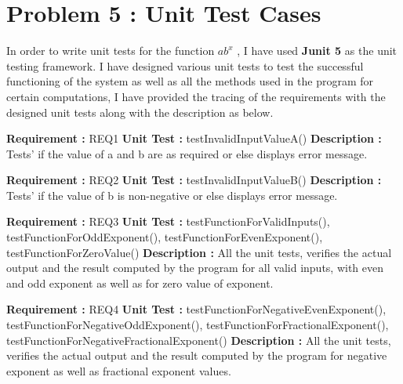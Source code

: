 \documentclass[12pt, a4paper]{article}
\begin{document}
\newpage

\section{Problem 5 : Unit Test Cases }
In order to write unit tests for the function $ab^x$ , I have used \textbf{Junit 5} \cite{JUnit5} as the unit testing framework. I have designed various unit tests to test the successful functioning of the system as well as all the methods used in the program for certain computations, I have provided the tracing of the requirements with the designed unit tests along with the description as below.  
\newline
    
\noindent
\textbf{Requirement : }  REQ1 
    \newline
    \textbf{Unit Test : } testInvalidInputValueA()
    \newline
    \textbf{Description :} Tests' if the value of a and b are as required or else displays error message.
    \newline
    
\noindent
\textbf{Requirement : }  REQ2
      \newline
    \textbf{Unit Test : } testInvalidInputValueB()
      \newline
    \textbf{Description :} Tests' if the value of b is non-negative or else displays error message.
    \newline
    
\noindent
\textbf{Requirement : }  REQ3
      \newline
    \textbf{Unit Test : } testFunctionForValidInputs(), 
    testFunctionForOddExponent(), \newline
    testFunctionForEvenExponent(),
    testFunctionForZeroValue()	
      \newline
    \textbf{Description :} All the unit tests, verifies the actual output and the result computed by the program for all valid inputs, with even and odd exponent as well as for zero value of exponent.
      \newline
    
\noindent
\textbf{Requirement : }  REQ4
      \newline
    \textbf{Unit Test : } testFunctionForNegativeEvenExponent(), \newline
    testFunctionForNegativeOddExponent(),
    testFunctionForFractionalExponent(), \newline
    testFunctionForNegativeFractionalExponent()
      \newline
    \textbf{Description :} All the unit tests, verifies the actual output and the result computed by the program for negative exponent as well as fractional exponent values.
      \newline
     
\end{document}
